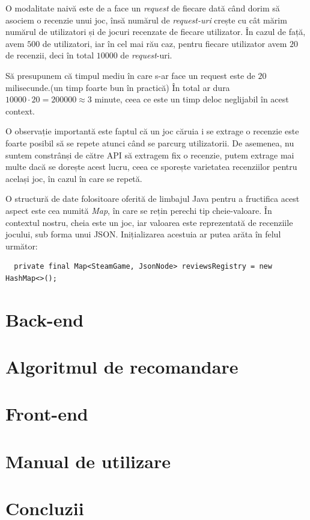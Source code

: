 \documentclass[12pt,a4paper]{report}
\begin{document}
O modalitate naivă este de a face un \emph{request} de fiecare dată când dorim să asociem o recenzie unui joc, însă numărul de \emph{request-uri} crește cu cât mărim numărul de utilizatori și de jocuri recenzate de fiecare utilizator. În cazul de față, avem \(500\) de utilizatori, iar în cel mai rău caz, pentru fiecare utilizator avem \(20\) de recenzii, deci în total \(10 000 \) de \emph{request}-uri.

Să presupunem că timpul mediu în care s-ar face un request este de \( 20 \) milisecunde.(un timp foarte bun în practică) În total ar dura \( 10 000 \cdot 20 = 200000 \approx 3 \) minute, ceea ce este un timp deloc neglijabil în acest context.

O observație importantă este faptul că un joc căruia i se extrage o recenzie este foarte posibil să se repete atunci când se parcurg utilizatorii. De asemenea, nu suntem constrânși de către API să extragem fix o recenzie, putem extrage mai multe dacă se dorește acest lucru, ceea ce sporește varietatea recenziilor pentru același joc, în cazul în care se repetă.

O structură de date folositoare oferită de limbajul Java pentru a fructifica acest aspect este cea numită \emph{Map}, în care se rețin perechi tip cheie-valoare. În contextul nostru, cheia este un joc, iar valoarea este reprezentată de recenziile jocului, sub forma unui JSON. Inițializarea acestuia ar putea arăta în felul următor:

\begin{verbatim}
  private final Map<SteamGame, JsonNode> reviewsRegistry = new HashMap<>();
\end{verbatim}


\section{Back-end}
\section{Algoritmul de recomandare}
\section{Front-end}
\section{Manual de utilizare}
\section{Concluzii}
\end{document}
